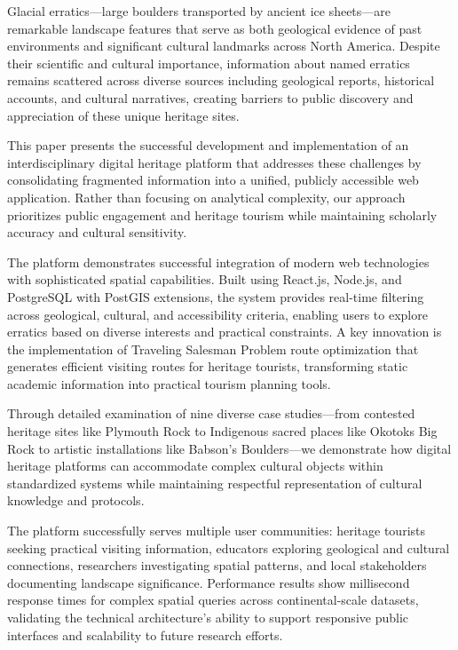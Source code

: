 \documentclass[
11pt, %
english, %
singlespacing, %
headsepline, %
]{MastersDoctoralThesis} %
\begin{document}
\begin{execSummary}
\addchaptertocentry{\execname}
Glacial erratics—large boulders transported by ancient ice sheets—are remarkable landscape features that serve as both geological evidence of past environments and significant cultural landmarks across North America. Despite their scientific and cultural importance, information about named erratics remains scattered across diverse sources including geological reports, historical accounts, and cultural narratives, creating barriers to public discovery and appreciation of these unique heritage sites.

This paper presents the successful development and implementation of an interdisciplinary digital heritage platform that addresses these challenges by consolidating fragmented information into a unified, publicly accessible web application. Rather than focusing on analytical complexity, our approach prioritizes public engagement and heritage tourism while maintaining scholarly accuracy and cultural sensitivity.

The platform demonstrates successful integration of modern web technologies with sophisticated spatial capabilities. Built using React.js, Node.js, and PostgreSQL with PostGIS extensions, the system provides real-time filtering across geological, cultural, and accessibility criteria, enabling users to explore erratics based on diverse interests and practical constraints. A key innovation is the implementation of Traveling Salesman Problem route optimization that generates efficient visiting routes for heritage tourists, transforming static academic information into practical tourism planning tools.

Through detailed examination of nine diverse case studies—from contested heritage sites like Plymouth Rock to Indigenous sacred places like Okotoks Big Rock to artistic installations like Babson's Boulders—we demonstrate how digital heritage platforms can accommodate complex cultural objects within standardized systems while maintaining respectful representation of cultural knowledge and protocols.

The platform successfully serves multiple user communities: heritage tourists seeking practical visiting information, educators exploring geological and cultural connections, researchers investigating spatial patterns, and local stakeholders documenting landscape significance. Performance results show millisecond response times for complex spatial queries across continental-scale datasets, validating the technical architecture's ability to support responsive public interfaces and scalability to future research efforts.


\end{execSummary}
\end{document}
